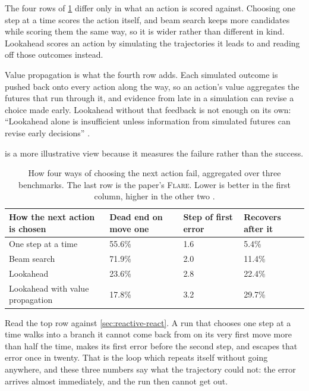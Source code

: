 The four rows of \cref{tab:planning-failure} differ only in what an action is scored against.
Choosing one step at a time scores the action itself, and beam search keeps more candidates while
scoring them the same way, so it is wider rather than different in kind. Lookahead scores an action
by simulating the trajectories it leads to and reading off those outcomes instead.

Value propagation is what the fourth row adds. Each simulated outcome is pushed back onto every
action along the way, so an action's value aggregates the futures that run through it, and evidence
from late in a simulation can revise a choice made early. Lookahead without that feedback is not
enough on its own: ``Lookahead alone is insufficient unless information from simulated futures can
revise early decisions'' \citep[\S4.2]{wang2026reasoningplan}.

 is a more illustrative view because it measures the failure rather than
the success.

\begin{table}[htbp]
  \caption{How four ways of choosing the next action fail, aggregated over three benchmarks. The
  last row is the paper's \textsc{Flare}. Lower is better in the first column, higher in the other
  two \citep[Table~3]{wang2026reasoningplan}.}
  \label{tab:planning-failure}
  \small
  \begin{tabularx}{\linewidth}{Xlll}
    \toprule
    How the next action is chosen & Dead end on move one & Step of first error & Recovers after it \\
    \midrule
    One step at a time & 55.6\% & 1.6 & 5.4\% \\
    Beam search & 71.9\% & 2.0 & 11.4\% \\
    Lookahead & 23.6\% & 2.8 & 22.4\% \\
    Lookahead with value propagation & 17.8\% & 3.2 & 29.7\% \\
    \bottomrule
  \end{tabularx}
\end{table}

Read the top row against \cref{sec:reactive-react}. A run that chooses one step at a time walks into
a branch it cannot come back from on its very first move more than half the time, makes its first
error before the second step, and escapes that error once in twenty. That is the loop which repeats
itself without going anywhere, and these three numbers say what the trajectory could not: the error
arrives almost immediately, and the run then cannot get out.

